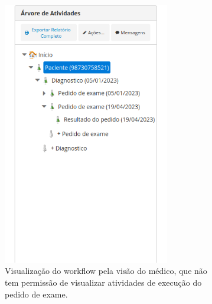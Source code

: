 \begin{figure}
    \centering

    \begin{subfigure}[b]{0.45\textwidth}
        \centering
        \includegraphics[width=0.8\textwidth]{imgs/Exemplo-Mestrado/arvore_medico.png}
        \caption{Visualização do workflow pela visão do médico, que não tem permissão de visualizar atividades de execução do pedido de exame.}
        \label{fig:arvore_medico}
    \end{subfigure}
    \hfill
    \begin{subfigure}[b]{0.45\textwidth}
        \centering

\end{subfigure}
\end{figure}
